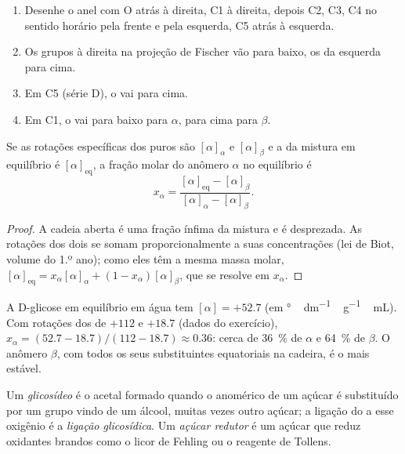 \begin{method}\label{met:b2:biomolecules:haworth}
\begin{enumerate}
  \item Desenhe o anel com O atrás à direita, C1 à direita, depois C2, C3, C4 no sentido horário pela
        frente e pela esquerda, C5 atrás à esquerda.
  \item Os grupos à direita na projeção de Fischer vão para baixo, os da esquerda para cima.
  \item Em C5 (série D), o  vai para cima.
  \item Em C1, o  vai para baixo para $\alpha$, para cima para $\beta$.
\end{enumerate}
\end{method}

\begin{proposition}\label{prop:b2:biomolecules:mutarotation}
Se as rotações específicas dos  puros são $[\alpha]_\alpha$ e $[\alpha]_\beta$ e a da mistura
em equilíbrio é $[\alpha]_{\mathrm{eq}}$, a fração molar do anômero $\alpha$ no
equilíbrio é
\begin{equation*}
x_\alpha = \frac{[\alpha]_{\mathrm{eq}} - [\alpha]_\beta}{[\alpha]_\alpha - [\alpha]_\beta}.
\end{equation*}
\end{proposition}

\begin{proof}
A cadeia aberta é uma fração ínfima da mistura e é desprezada. As rotações dos dois  se somam
proporcionalmente a suas concentrações (lei de Biot, volume do 1.º ano); como eles têm a mesma massa
molar, $[\alpha]_{\mathrm{eq}} = x_\alpha[\alpha]_\alpha + (1 - x_\alpha)[\alpha]_\beta$, que se
resolve em $x_\alpha$.
\end{proof}

A D-glicose em equilíbrio em água tem $[\alpha] = +52.7$ (em \unit{\degree\,dm^{-1}\,g^{-1}\,mL}).
Com rotações dos  de $+112$ e $+18.7$ (dados do exercício), $x_\alpha = (52.7 - 18.7)/(112 - 18.7)
\approx 0.36$: cerca de 36~\% de $\alpha$ e 64~\% de $\beta$. O anômero $\beta$, com todos os seus
substituintes equatoriais na cadeira, é o mais estável.

\begin{definition}[Glicosídeos]\label{def:b2:biomolecules:glycoside}
Um \emph{glicosídeo} é o acetal formado quando o  anomérico de um açúcar é
substituído por um grupo  vindo de um álcool, muitas vezes outro açúcar; a ligação do  a esse oxigênio é a \emph{ligação glicosídica}. Um \emph{açúcar redutor}
é um açúcar que reduz oxidantes brandos como o licor de Fehling ou o reagente de Tollens.
\end{definition}

